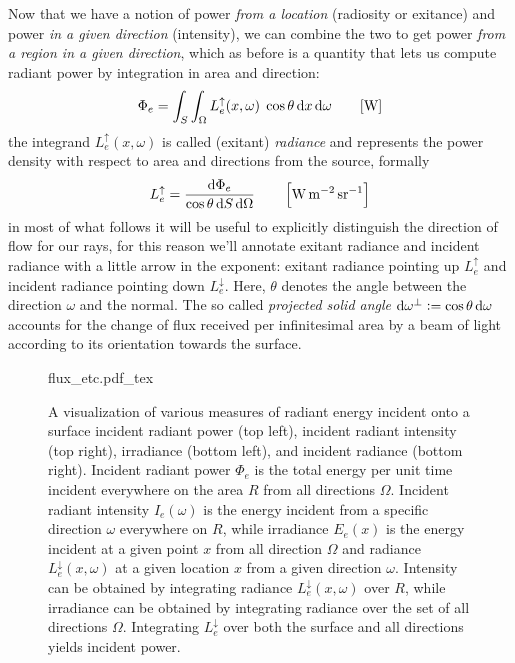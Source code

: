 Now that we have a notion of power \textit{from a location} (radiosity or exitance) 
and power \textit{in a given direction} (intensity), 
we can combine the two to get power \textit{from a region
in a given direction}, which as before is a quantity that lets us compute
radiant power by integration in area and direction:
\begin{displaymath}
\Phi_e = \int_{S} \int_\Omega L_e^\uparrow(x, \omega) \;\cos\theta\d x\d\omega
\qquad [\unit{\watt}]
\end{displaymath}
the integrand $L_e^\uparrow(x, \omega)$ is called (exitant) \textsl{radiance}
and represents the power density with respect to area and directions from
the source, formally
\begin{displaymath}
L_e^\uparrow = \frac{\d\Phi_e}{\cos\theta \d S \d\Omega}
\qquad \left[\unit{\watt\per\square\meter\per\steradian}\right]
\end{displaymath}
in most of what follows it will be useful to explicitly distinguish the direction of
flow for our rays, for this reason we'll annotate \gls{exitant} radiance 
and \gls{incident} radiance with a little arrow in the exponent:
exitant radiance pointing up $L_e^\uparrow$ and incident radiance pointing down
$L_e^\downarrow$.
Here, $\theta$ denotes the angle between the direction $\omega$ and the normal.
The so called \emph{projected solid angle} $\mathop{}\!\mathrm{d}\omega^\bot := \cos \theta \mathop{}\!\mathrm{d} \omega$
accounts for the change of flux received per infinitesimal area by a beam of light
according to its orientation towards the surface.

\begin{figure}[tb]
    \centering
    \def\svgwidth{\linewidth}
    {flux_etc.pdf_tex}
    \caption{\label{fig:flux_etc}%
    A visualization of various measures of radiant energy incident onto a surface
    incident radiant power (top left), incident radiant intensity (top right), 
    irradiance (bottom left), and incident radiance (bottom right).
    Incident radiant power $\Phi_e$ is the total energy per unit time incident everywhere 
    on the area $R$ from all directions $\Omega$. 
    Incident radiant intensity $I_e(\omega)$ is the energy incident from a specific 
    direction $\omega$ everywhere on $R$, 
    while irradiance $E_e(x)$ is the energy incident at a given point $x$ from all direction $\Omega$ and
    radiance $L^\downarrow_e(x,\omega)$ at a given location $x$ from a given direction $\omega$.
    Intensity can be obtained by integrating radiance $L^\downarrow_e(x,\omega)$ over $R$, 
    while irradiance can be obtained by integrating radiance over the set of
    all directions $\Omega$. 
    Integrating $L^\downarrow_e$ over both the surface and all directions yields incident power. }
\end{figure}

